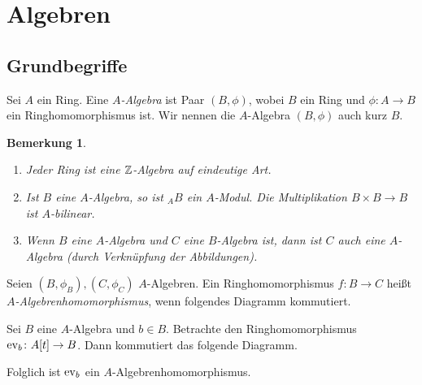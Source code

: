 \documentclass[12pt,a4paper]{scrartcl}
\theoremstyle{cplain}
\theoremstyle{cdef}
\newtheorem{beme}[thmcounter]{Bemerkung}
\begin{document}

\section{Algebren}
\subsection{Grundbegriffe}
\begin{defi}
	Sei $A$ ein Ring. Eine \emph{$A$-Algebra} ist Paar $(B,\phi)$, wobei $B$ ein Ring und $\phi\colon A\to B$ ein Ringhomomorphismus ist. Wir nennen die $A$-Algebra $(B,\phi)$ auch kurz $B$.
\end{defi}
\begin{beme}
	\leavevmode
	\begin{enumerate}
		\item Jeder Ring ist eine $\mathbb Z$-Algebra auf eindeutige Art.
		\item Ist $B$ eine $A$-Algebra, so ist ${}_AB$ ein $A$-Modul. Die Multiplikation $B\times B\to B$ ist $A$-bilinear.
		\item Wenn $B$ eine $A$-Algebra und $C$ eine $B$-Algebra ist, dann ist $C$ auch eine $A$-Algebra (durch Verknüpfung der Abbildungen).
	\end{enumerate}
\end{beme}
\begin{defi}
	Seien $(B, \phi_B),(C,\phi_C)$ $A$-Algebren. Ein Ringhomomorphismus $f\colon B\to C$ heißt \emph{$A$-Algebrenhomomorphismus}, wenn folgendes Diagramm kommutiert.
	\begin{center}
	\end{center}
\end{defi}
\begin{bsp}
	Sei $B$ eine $A$-Algebra und $b\in B$. Betrachte den Ringhomomorphismus $\operatorname{ev}_b\colon A[t]\to B$. Dann kommutiert das folgende Diagramm.
	\begin{center}
	\end{center}
	Folglich ist $\operatorname{ev}_b$ ein $A$-Algebrenhomomorphismus.
\end{bsp}
\end{document}
